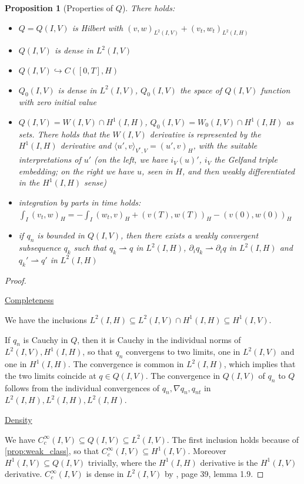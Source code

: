 \documentclass[english,a4paper,9pt,oneside]{scrbook}	%
\theoremstyle{break}
\newtheorem{prop}[equation]{Proposition}
\newenvironment{mproof}[1][\proofname]{%
  \begin{proof}[#1]$ $\par\nobreak\ignorespaces
}{%
  \end{proof}
}
\renewcommand*{\proofname}{Proof}
\theoremstyle{remark}
\newcommand{\emb}{\hookrightarrow}
\newcommand{\weakc}{\rightharpoonup}
\begin{document}
\begin{appendices}
\begin{prop}[Properties of $Q$]
\label{prop:Q}
There holds:
\begin{itemize}
	\item $Q=Q(I,V)$ is Hilbert with $(v,w)_{L^2(I,V)} + (v_t,w_t)_{L^2(I,H)}$ 
	\item $Q(I,V)$ is dense in $L^2(I,V)$
	\item $Q(I,V)\emb C([0,T],H)$
	\item $Q_0(I,V)$ is dense in $L^2(I,V)$, $Q_0(I,V)$ the space of $Q(I,V)$ function with zero initial value
	\item $Q(I,V) = W(I,V)\cap H^1(I,H)$, $Q_0(I,V) =  W_0(I,V)\cap H^1(I,H)$ as sets. There holds that the $W(I,V)$ derivative is represented by the $H^1(I,H)$ derivative and $\langle u', v\rangle_{V^*,V} = (u',v)_H$, with the suitable interpretations of $u'$ (on the left, we have $i_V(u)'$, $i_V$ the Gelfand triple embedding; on the right we have $u$, seen in $H$, and then weakly differentiated in the $H^1(I,H)$ sense)
	\item integration by parts in time holds: $\int_I(v_t,w)_H = -\int_I(w_t,v)_H +(v(T),w(T))_H-(v(0),w(0))_H$
	\item if $q_n$ is bounded in $Q(I,V)$, then there exists a weakly convergent subsequence $q_k$ such that $q_k\weakc q$ in $L^2(I,H)$, $\partial_i q_k\weakc \partial_i q$ in $L^2(I,H)$ and $q_k'\weakc q'$ in $L^2(I,H)$
\end{itemize}
\end{prop}
\begin{mproof}

\underline{Completeness}

We have the inclusions $L^2(I,H)\subseteq L^2(I,V)\cap H^1(I,H)\subseteq H^1(I,V)$.

If $q_n$ is Cauchy in $Q$, then it is Cauchy in the individual norms of $ L^2(I,V), H^1(I,H)$, so that $q_n$ convergens to two limits, one in $L^2(I,V)$ and one in $H^1(I,H)$. The convergence is common in $L^2(I,H)$, which implies that the two limits coincide at $q \in Q(I,V)$. The convergence in $Q(I,V)$ of $q_n$ to $Q$ follows from the individual convergences of $q_n, \nabla q_n, q_{nt}$ in $ L^2(I,H), L^2(I,H),L^2(I,H)$.

\underline{Density}

We have $C_c^\infty(I,V) \subseteq Q(I,V) \subseteq L^2(I,V)$. The first inclusion holds because of \cref{prop:weak_class}, so that $C_c^\infty(I,V)\subseteq H^1(I,V)$. Moreover $H^1(I,V)\subseteq  Q(I,V) $ trivially, where the $H^1(I,H)$ derivative is the $H^1(I,V)$ derivative. $C_c^\infty(I,V)$ is dense in $ L^2(I,V)$ by \cite{hinze}, page 39, lemma 1.9.


\end{mproof}
\end{appendices}
\end{document}
